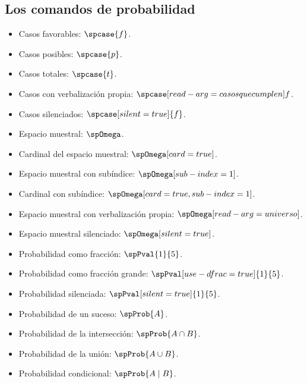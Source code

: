 \documentclass{article}
\begin{document}
\subsection*{Los comandos de probabilidad}

\begin{itemize}
  \item Casos favorables: $\spcase{f}$.
  \item Casos posibles: $\spcase{p}$.
  \item Casos totales: $\spcase{t}$.
  \item Casos con verbalización propia: $\spcase[read-arg={casos que cumplen}]{f}$.
  \item Casos silenciados: $\spcase[silent=true]{f}$.
  \item Espacio muestral: $\spOmega$.
  \item Cardinal del espacio muestral: $\spOmega[card=true]$.
  \item Espacio muestral con subíndice: $\spOmega[sub-index={1}]$.
  \item Cardinal con subíndice: $\spOmega[card=true,sub-index={1}]$.
  \item Espacio muestral con verbalización propia: $\spOmega[read-arg={universo}]$.
  \item Espacio muestral silenciado: $\spOmega[silent=true]$.
  \item Probabilidad como fracción: $\spPval{1}{5}$.
  \item Probabilidad como fracción grande: $\spPval[use-dfrac=true]{1}{5}$.
  \item Probabilidad silenciada: $\spPval[silent=true]{1}{5}$.
  \item Probabilidad de un suceso: $\spProb{A}$.
  \item Probabilidad de la intersección: $\spProb{A \cap B}$.
  \item Probabilidad de la unión: $\spProb{A \cup B}$.
  \item Probabilidad condicional: $\spProb{A \mid B}$.

\end{itemize}
\end{document}
